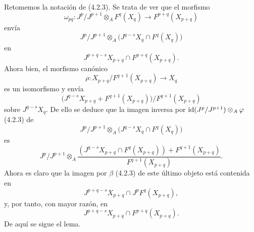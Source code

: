 \begin{prooftext}[Demostración de 4.2.7]
Retomemos la notación de (4.2.3). Se trata de ver que el morfismo
\[
\omega_{pq}:J^p/J^{p+1}\otimes_A F^q(X_q)\longrightarrow F^{p+q}(X_{p+q})
\]
envía
\[
J^p/J^{p+1}\otimes_A
\bigl(J^{q-s}X_q\cap F^q(X_q)\bigr)
\]
en
\[
J^{p+q-s}X_{p+q}\cap F^{p+q}(X_{p+q}).
\]
Ahora bien, el morfismo canónico
\[
\rho:X_{p+q}/F^{q+1}(X_{p+q})\longrightarrow X_q
\]
es un isomorfismo y envía
\[
\bigl(J^{q-s}X_{p+q}+F^{q+1}(X_{p+q})\bigr)/F^{q+1}(X_{p+q})
\]
sobre \(J^{q-s}X_q\). De ello se deduce que la imagen inversa por
\(\operatorname{id}(J^p/J^{p+1})\otimes_A\varphi\) (4.2.3) de
\[
J^p/J^{p+1}\otimes_A
\bigl(J^{q-s}X_q\cap F^q(X_q)\bigr)
\]
es
\[
J^p/J^{p+1}\otimes_A
\frac{(J^{q-s}X_{p+q}\cap F^q(X_{p+q}))+F^{q+1}(X_{p+q})}
     {F^{q+1}(X_{p+q})}.
\]
Ahora es claro que la imagen por \(\beta\) (4.2.3) de este último objeto está contenida en
\[
J^{p+q-s}X_{p+q}\cap J^pF^q(X_{p+q}),
\]
y, por tanto, con mayor razón, en
\[
J^{p+q-s}X_{p+q}\cap F^{p+q}(X_{p+q}).
\]
De aquí se sigue el lema.
\end{prooftext}
